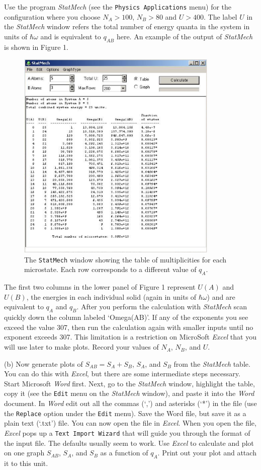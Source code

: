 Use the program {\it StatMech} (see the {\tt Physics Applications} menu)
for the configuration where you choose $N_A > 100$, $N_B > 80$ and $U>400$.
The label $U$ in the {\it StatMech} window refers the total number of energy quanta 
in the system
in units of $\hbar \omega$ and is equivalent to $q_{AB}$ here.
An example of the output of {\it StatMech} is shown in Figure 1.
\begin{figure}[h!]
\begin{center}
\includegraphics[height=4.0in]{statmech1.eps}
\caption{The {\tt StatMech} window showing the table of multiplicities for each microstate.
Each row corresponds to a different value of $q_A$.}
\end{center}
\end{figure}
The first two columns in the lower panel of Figure 1 represent $U(A)$ and $U(B)$, 
the energies in each 
individual solid (again in units of $\hbar \omega$) and are equivalent to $q_A$ and $q_B$.
After you perform the calculation with {\it StatMech} scan quickly down the column
labeled `Omega(AB)'.
If any of the exponents you see exceed the value 307, then run the calculation again with 
smaller inputs until no exponent exceeds 307.
This limitation is a restriction on MicroSoft {\it Excel} that you will use later to make
plots.
Record your values of $N_A$, $N_B$, and $U$.
\vspace{15mm}

(b) Now generate plots of $S_{AB}=S_A + S_B$, $S_A$, and $S_B$ from the {\it StatMech} table.
You can do this with {\it Excel}, but there are some intermediate steps necessary.
Start Microsoft {\it Word} first.
Next, go to the {\it StatMech} window, highlight the table, copy it
 (see the {\tt Edit} menu on the {\it StatMech} window), and paste it into the {\it Word}
document. 
In {\it Word} edit out all the commas (`,') and asterisks (`*') in the file 
(use the {\tt Replace}
option under the {\tt Edit} menu).
Save the Word file, but save it as a plain text (`\*.txt') file.
You can now open the file in {\it Excel}.
When you open the file, {\it Excel} pops up a {\tt Text Import Wizard} 
that will guide you through
the format of the input file.
The defaults usually seem to work.
Use {\it Excel} to calculate and plot on one graph $S_{AB}$, $S_A$, and $S_B$
as a function of $q_A$.
Print out your plot and attach it to this unit.

